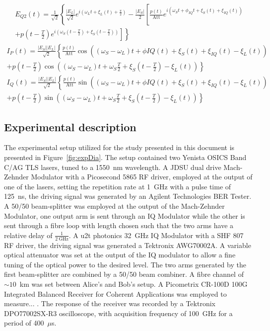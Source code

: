 \begin{multline}\label{eq:18}
E_{Q2}(t)=\frac{1}{\sqrt{2}}\left\lbrace\frac{|E_L|}{\sqrt{2}}e^{i\left(\omega_Lt+\xi_L(t)+\frac{\pi}{2}\right)}-\frac{|E_S|}{2}\left[\frac{p(t)}{\text{Att}}e^{i(\omega_St+\phi_{IQ}t+\xi_S(t)+\xi_{IQ}(t))}\right.\right.\\
\left.\left.+p\left(t-\frac{T}{2}\right)e^{i\left(\omega_S\left(t-\frac{T}{2}\right)+\xi_S\left(t-\frac{T}{2}\right)\right)}\right]\right\rbrace
\end{multline}
\begin{multline}\label{eq:19}
I_P(t)=\frac{|E_S||E_L|}{\sqrt{2}}\left\lbrace\frac{p(t)}{\text{Att}}\cos((\omega_S-\omega_L)t+\phi{IQ}(t)+\xi_S(t)+\xi_{IQ}(t)-\xi_L(t))\right.\\
\left.+p\left(t-\frac{T}{2}\right)\cos\left((\omega_S-\omega_L)t+\omega_S\frac{T}{2}+\xi_S\left(t-\frac{T}{2}\right)-\xi_L(t)\right)\right\rbrace
\end{multline}
\begin{multline}\label{eq:20}
I_Q(t)=\frac{|E_S||E_L|}{\sqrt{2}}\left\lbrace\frac{p(t)}{\text{Att}}\sin((\omega_S-\omega_L)t+\phi{IQ}(t)+\xi_S(t)+\xi_{IQ}(t)-\xi_L(t))\right.\\
\left.+p\left(t-\frac{T}{2}\right)\sin\left((\omega_S-\omega_L)t+\omega_S\frac{T}{2}+\xi_S\left(t-\frac{T}{2}\right)-\xi_L(t)\right)\right\rbrace
\end{multline}

\subsection*{Experimental description}

The experimental setup utilized for the study presented in this document is presented in Figure~\ref{fig:expDia}. The setup contained two Yenista OSICS Band C/AG TLS lasers, tuned to a 1550~nm wavelength. A JDSU dual drive Mach-Zehnder Modulator with a Picosecond 5865 RF driver, employed at the output of one of the lasers, setting the repetition rate at 1~GHz with a pulse time of 125~ns, the driving signal was generated by an Agilent Technologies BER Tester. A 50/50 beam-splitter was employed at the output of the Mach-Zehnder Modulator, one output arm is sent through an IQ Modulator while the other is sent through a fibre loop with length chosen such that the two arms have a relative delay of $\frac{1}{2~\text{GHz}}$. A u2t photonics 32~GHz IQ Modulator with a SHF 807 RF driver, the driving signal was generated a Tektronix AWG70002A. A variable optical attenuator was set at the output of the IQ modulator to allow a fine tuning of the optical power to the desired level. The two arms generated by the first beam-splitter are combined by a 50/50 beam combiner. A fibre channel of $\sim10$~km was set between Alice's and Bob's setup. A Picometrix CR-100D 100G Integrated Balanced Receiver for Coherent Applications was employed to measure... . The response of the receiver was recorded by a Tektronix DPO77002SX-R3 oscilloscope, with acquisition frequency of 100~GHz for a period of 400~$\mu$s.

